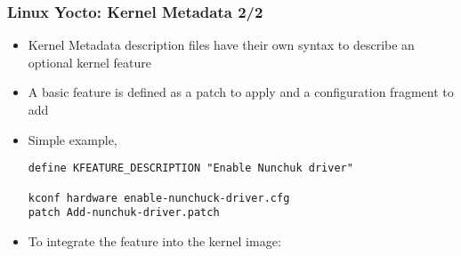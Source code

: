 \begin{frame}[fragile]
  \frametitle{Linux Yocto: Kernel Metadata 2/2}
  \begin{itemize}
    \item Kernel Metadata description files have their own syntax to describe an optional kernel feature
    \item A basic feature is defined as a patch to apply and a
      configuration fragment to add
    \item Simple example, 
      \begin{block}{}
        \begin{verbatim}
define KFEATURE_DESCRIPTION "Enable Nunchuk driver"

kconf hardware enable-nunchuck-driver.cfg
patch Add-nunchuk-driver.patch
        \end{verbatim}
      \end{block}
    \item To integrate the feature into the kernel image:
  \end{itemize}
\end{frame}
